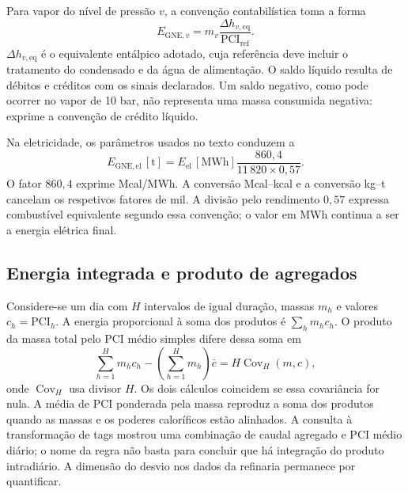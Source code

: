Para vapor do nível de pressão $v$, a convenção contabilística toma a forma
\begin{equation}
E_{\mathrm{GNE},v}=m_v\frac{\Delta h_{v,\mathrm{eq}}}{\mathrm{PCI}_{\mathrm{ref}}}.
\label{eq:mat-gne-vapor}
\end{equation}
$\Delta h_{v,\mathrm{eq}}$ é o equivalente entálpico adotado, cuja referência deve incluir o tratamento do condensado e da água de alimentação. O saldo líquido resulta de débitos e créditos com os sinais declarados. Um saldo negativo, como pode ocorrer no vapor de 10 bar, não representa uma massa consumida negativa: exprime a convenção de crédito líquido.

Na eletricidade, os parâmetros usados no texto conduzem a
\begin{equation}
E_{\mathrm{GNE,el}}\,[\mathrm{t}]
=E_{\mathrm{el}}\,[\mathrm{MWh}]
\frac{860{,}4}{11\,820\times0{,}57}.
\label{eq:mat-gne-eletricidade}
\end{equation}
O fator $860{,}4$ exprime Mcal/MWh. A conversão Mcal--kcal e a conversão kg--t cancelam os respetivos fatores de mil. A divisão pelo rendimento $0{,}57$ expressa combustível equivalente segundo essa convenção; o valor em MWh continua a ser a energia elétrica final.


\subsection{Energia integrada e produto de agregados}
\label{sec:mat-produto-medias}
Considere-se um dia com $H$ intervalos de igual duração, massas $m_h$ e valores $c_h=\mathrm{PCI}_h$. A energia proporcional à soma dos produtos é $\sum_hm_hc_h$. O produto da massa total pelo PCI médio simples difere dessa soma em
\begin{equation}
\sum_{h=1}^H m_hc_h-\left(\sum_{h=1}^Hm_h\right)\bar c
=H\operatorname{Cov}_H(m,c),
\label{eq:mat-covariancia-agregacao}
\end{equation}
onde $\operatorname{Cov}_H$ usa divisor $H$. Os dois cálculos coincidem se essa covariância for nula. A média de PCI ponderada pela massa reproduz a soma dos produtos quando as massas e os poderes caloríficos estão alinhados. A consulta à transformação de tags mostrou uma combinação de caudal agregado e PCI médio diário; o nome da regra não basta para concluir que há integração do produto intradiário. A dimensão do desvio nos dados da refinaria permanece por quantificar.

